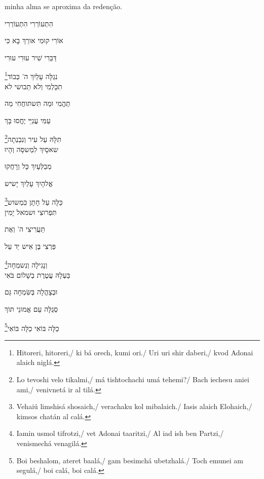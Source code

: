 minha alma se aproxima da redenção.\\[10pt]


\movetoevenpage
\raggedleft %

\vspace*{1cm}

הִתְעוֹרְרִי הִתְעוֹרְרִי

אוֹרִי קוּמִי אורֵךְ בָא כִּי

דַּבֵּרִי שִׁיר עוּרִי עוּרִי

\footnote{Hitoreri, hitoreri,/ ki bá orech, kumi ori./ Uri uri shir daberi,/ kvod Adonai alaich niglá.}נִגְלָּה עָלַיִךְ ה' כְּבוֹד\\[10pt]

תִכָּלְמִי וְלא תֵבושי לא 

תֶּהֱמִי וּמַה תִּשתּוחֲחִי מַה

עַמִּי עֲנִיֵּי יֶחֱסוּ בָּךְ

\footnote{Lo tevoshi velo tikalmi,/ má tishtochachi umá tehemi?/ Bach iechesu aniei ami,/ venivnetá ir al tilá.}תִּלָּהּ עַל עִיר וְנִבְנְתָה\\[10pt]

שאסָיִךְ לִמְשסָּה וְהָיוּ

מְבַלְּעָיִךְ כָּל וְרָחֲקוּ

אֱלהָיִךְ עָלַיִךְ יָשיש

\footnote{Vehaiú limshisá shosaich,/ verachaku kol mibalaich./ Iasis alaich Elohaich,/ kimsos chatán al calá.}כַּלָּה עַל חָתָן כִּמְשוש\\[10pt]

תִּפְרוצִי וּשמאל יָמִין

תַּעֲרִיצִי ה' וְאֶת

פַּרְצִי בֶּן אִיש יַד עַל 

\footnote{Iamin usmol tifrotzi,/ vet Adonai taaritzi,/ Al iad ish ben Partzi,/ venismechá venagilá.}וְנָגִילָה וְנִשמְחָה\\[10pt]


בַּעְלָהּ עֲטֶרֶת בְשָׁלוֹם בֹּאִי

וּבְצָהֳלָה בְּשִּׂמְחָה גַּם 

סְגֻלָּה עַם אֱמוּנֵי תּוֹךְ 

\footnote{Boi beshalom, ateret baalá,/ gam besimchá ubetzhalá./ Toch emunei am segulá,/ boi calá, boi calá.}כַלָּה בּוֹאִי כַלָּה בּוֹאִי

\movetooddpage
\raggedright %

\vspace*{1cm}

